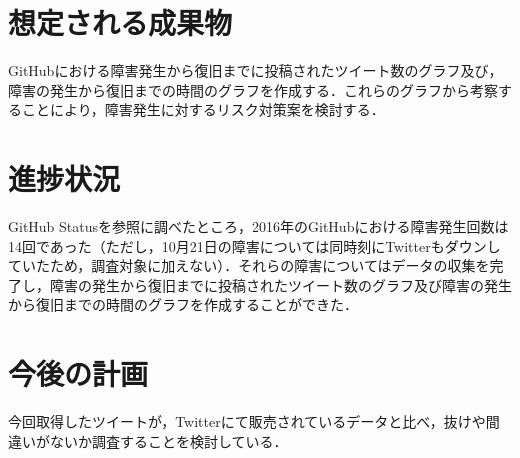 \documentclass[uplatex,twocolumn,dvipdfmx]{jsarticle}
\begin{document}
\section{想定される成果物}
GitHubにおける障害発生から復旧までに投稿されたツイート数のグラフ及び，障害の発生から復旧までの時間のグラフを作成する．これらのグラフから考察することにより，障害発生に対するリスク対策案を検討する．
\section{進捗状況}
GitHub Statusを参照に調べたところ，2016年のGitHubにおける障害発生回数は14回であった（ただし，10月21日の障害については同時刻にTwitterもダウンしていたため，調査対象に加えない）．それらの障害についてはデータの収集を完了し，障害の発生から復旧までに投稿されたツイート数のグラフ及び障害の発生から復旧までの時間のグラフを作成することができた．
\section{今後の計画}
今回取得したツイートが，Twitterにて販売されているデータと比べ，抜けや間違いがないか調査することを検討している．

\end{document}
